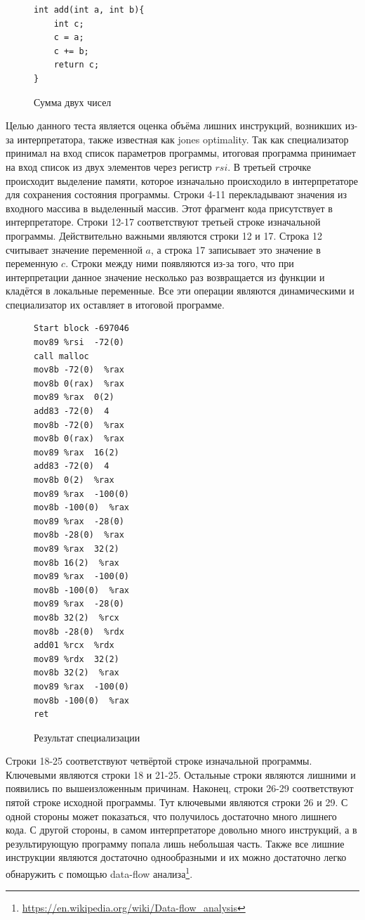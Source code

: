 \begin{figure}
\begin{lstlisting}[xleftmargin = 20pt]
int add(int a, int b){
    int c;
    c = a;
    c += b;
    return c;
}
\end{lstlisting}
\caption{ Сумма двух чисел}
\label{fig:add}
\end{figure}

Целью данного теста является оценка объёма лишних инструкций, возникших из-за интерпретатора, также известная как jones optimality\cite{optimal}. Так как специализатор принимал на вход список параметров программы, итоговая программа принимает на вход список из двух элементов через регистр $rsi$. В третьей строчке происходит выделение памяти, которое изначально происходило в интерпретаторе для сохранения состояния программы. Строки 4-11 перекладывают значения из входного массива в выделенный массив. Этот фрагмент кода присутствует в интерпретаторе. Строки 12-17 соответствуют третьей строке изначальной программы. Действительно важными являются строки 12 и 17. Строка 12 считывает значение переменной $a$, а строка 17 записывает это значение в переменную $c$. Строки между ними появляются из-за того, что при интерпретации данное значение несколько раз возвращается из функции и кладётся в локальные переменные. Все эти операции являются динамическими и специализатор их оставляет в итоговой программе. 

\begin{figure}[t]
\begin{multicols}{2}
\begin{lstlisting}
Start block -697046
mov89 %rsi  -72(0) 
call malloc
mov8b -72(0)  %rax
mov8b 0(rax)  %rax
mov89 %rax  0(2)
add83 -72(0)  4
mov8b -72(0)  %rax
mov8b 0(rax)  %rax
mov89 %rax  16(2)
add83 -72(0)  4
mov8b 0(2)  %rax 
mov89 %rax  -100(0) 
mov8b -100(0)  %rax 
mov89 %rax  -28(0) 
mov8b -28(0)  %rax 
mov89 %rax  32(2)
mov8b 16(2)  %rax 
mov89 %rax  -100(0) 
mov8b -100(0)  %rax 
mov89 %rax  -28(0) 
mov8b 32(2)  %rcx 
mov8b -28(0)  %rdx 
add01 %rcx  %rdx 
mov89 %rdx  32(2) 
mov8b 32(2)  %rax 
mov89 %rax  -100(0) 
mov8b -100(0)  %rax 
ret
\end{lstlisting}
\end{multicols}
\caption{ Результат специализации}
\label{fig:specadd}
\end{figure}

Строки 18-25 соответствуют четвёртой строке изначальной программы. Ключевыми являются строки 18 и 21-25. Остальные строки являются лишними и появились по вышеизложенным причинам. Наконец, строки 26-29 соответствуют пятой строке исходной программы. Тут ключевыми являются строки 26 и 29. С одной стороны может показаться, что получилось достаточно много лишнего кода. С другой стороны, в самом интерпретаторе довольно много инструкций, а в результирующую программу попала лишь небольшая часть. Также все лишние инструкции являются достаточно однообразными и их можно достаточно легко обнаружить с помощью data-flow анализа\footnote{\url{https://en.wikipedia.org/wiki/Data-flow_analysis}}.

